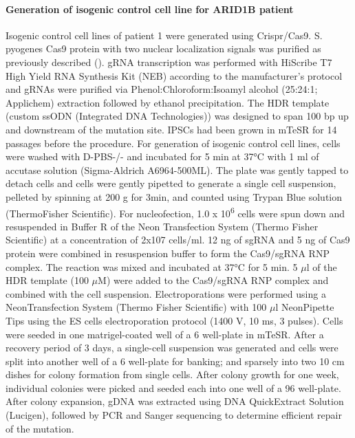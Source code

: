 \paragraph{Generation of isogenic control cell line for ARID1B patient}
Isogenic control cell lines of patient 1 were generated using Crispr/Cas9. S. pyogenes Cas9 protein with two nuclear localization signals was purified as previously described (\cite{jinek_programmable_2012}). gRNA transcription was performed with HiScribe T7 High Yield RNA Synthesis Kit (NEB) according to the manufacturer's protocol and gRNAs were purified via Phenol:Chloroform:Isoamyl alcohol (25:24:1; Applichem) extraction followed by ethanol precipitation. The HDR template (custom ssODN (Integrated DNA Technologies)) was designed to span 100 bp up and downstream of the mutation site. IPSCs had been grown in mTeSR for 14 passages before the procedure. For generation of isogenic control cell lines, cells were washed with D-PBS-/- and incubated for 5 min at 37°C with 1 ml of accutase solution (Sigma-Aldrich A6964-500ML). The plate was gently tapped to detach cells and cells were gently pipetted to generate a single cell suspension, pelleted by spinning at 200 g for 3min, and counted using Trypan Blue solution (ThermoFisher Scientific). For nucleofection, 1.0 x 10\textsuperscript{6} cells were spun down and resuspended in Buffer R of the Neon Transfection System (Thermo Fisher Scientific) at a concentration of 2x107 cells/ml. 12 ng of sgRNA and 5 ng of Cas9 protein were combined in resuspension buffer to form the Cas9/sgRNA RNP complex. The reaction was mixed and incubated at 37°C for 5 min. 5 $\mu$l of the HDR template (100 $\mu$M) were added to the Cas9/sgRNA RNP complex and combined with the cell suspension. Electroporations were performed using a Neon\textregistered Transfection System (Thermo Fisher Scientific) with 100 $\mu$l Neon\textregistered Pipette Tips using the ES cells electroporation protocol (1400 V, 10 ms, 3 pulses). Cells were seeded in one matrigel-coated well of a 6 well-plate in mTeSR. After a recovery period of 3 days, a single-cell suspension was generated and cells were split into another well of a 6 well-plate for banking; and sparsely into two 10 cm dishes for colony formation from single cells. After colony growth for one week, individual colonies were picked and seeded each into one well of a 96 well-plate. After colony expansion, gDNA was extracted using DNA QuickExtract Solution (Lucigen), followed by PCR and Sanger sequencing to determine efficient repair of the mutation. 


